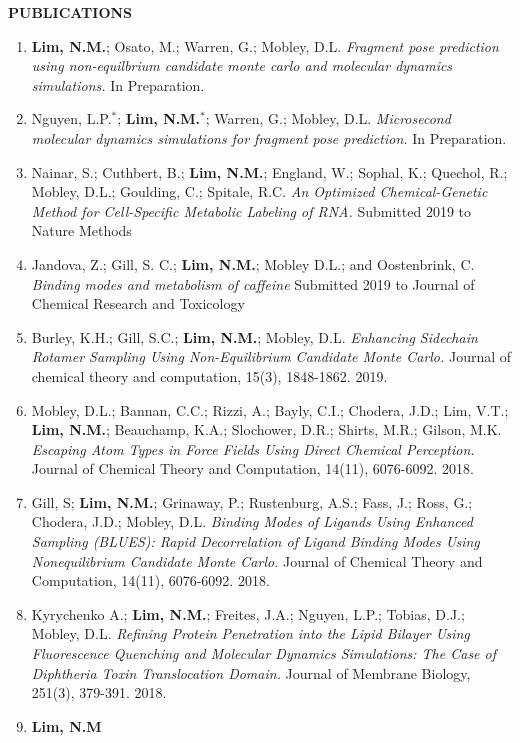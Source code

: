 {\textbf{PUBLICATIONS}
\begin{enumerate}
    \item \textbf{Lim, N.M.}; Osato, M.; Warren, G.; Mobley, D.L.
        \textit{Fragment pose prediction using non-equilbrium candidate monte carlo and molecular dynamics simulations.}
        In Preparation.
    \item Nguyen, L.P.$^*$; \textbf{Lim, N.M.$^*$}; Warren, G.; Mobley, D.L.
        \textit{Microsecond molecular dynamics simulations for fragment pose prediction.}
        In Preparation.
    \item Nainar, S.; Cuthbert, B.; \textbf{Lim, N.M.}; England, W.; Sophal, K.; Quechol, R.; Mobley, D.L.; Goulding, C.; Spitale, R.C. 
        \textit{An Optimized Chemical-Genetic Method for Cell-Specific Metabolic Labeling of RNA.}
        Submitted 2019 to Nature Methods
    \item Jandova, Z.; Gill, S. C.; \textbf{Lim, N.M.}; Mobley D.L.; and Oostenbrink, C.
        \textit{Binding modes and metabolism of caffeine}
        Submitted 2019 to Journal of Chemical Research and Toxicology
    \item Burley, K.H.; Gill, S.C.; \textbf{Lim, N.M.}; Mobley, D.L.
        \textit{Enhancing Sidechain Rotamer Sampling Using Non-Equilibrium Candidate Monte Carlo.}
        Journal of chemical theory and computation, 15(3), 1848-1862. 2019.
    \item Mobley, D.L.; Bannan, C.C.; Rizzi, A.; Bayly, C.I.; Chodera, J.D.; Lim, V.T.; \textbf{Lim, N.M.}; Beauchamp, K.A.; Slochower, D.R.; Shirts, M.R.; Gilson, M.K.
        \textit{Escaping Atom Types in Force Fields Using Direct Chemical Perception.}
        Journal of Chemical Theory and Computation, 14(11), 6076-6092. 2018.
    \item Gill, S; \textbf{Lim, N.M.}; Grinaway, P.; Rustenburg, A.S.; Fass, J.; Ross, G.; Chodera, J.D.; Mobley, D.L.
        \textit{Binding Modes of Ligands Using Enhanced Sampling (BLUES): Rapid Decorrelation of Ligand Binding Modes Using Nonequilibrium Candidate Monte Carlo.}
        Journal of Chemical Theory and Computation, 14(11), 6076-6092. 2018.
    \item Kyrychenko A.; \textbf{Lim, N.M.}; Freites, J.A.; Nguyen, L.P.; Tobias, D.J.; Mobley, D.L.
        \textit{Refining Protein Penetration into the Lipid Bilayer Using Fluorescence Quenching and Molecular Dynamics Simulations: The Case of Diphtheria Toxin Translocation Domain.}
        Journal of Membrane Biology, 251(3), 379-391. 2018.
    \item \textbf{Lim, N.M} 

\end{enumerate}}
